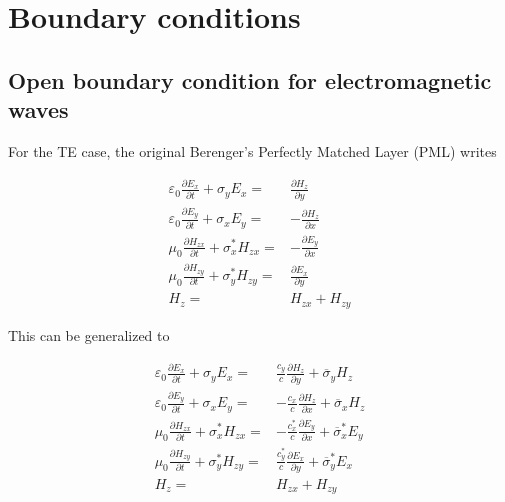 %
%



\section{Boundary conditions}

\subsection{Open boundary condition for electromagnetic waves}

For the TE case, the original Berenger's Perfectly Matched Layer (PML) writes

\begin{eqnarray}
\varepsilon _{0}\frac{\partial E_{x}}{\partial t}+\sigma _{y}E_{x} = & \frac{\partial H_{z}}{\partial y}\label{PML_def_1} \\
\varepsilon _{0}\frac{\partial E_{y}}{\partial t}+\sigma _{x}E_{y} = & -\frac{\partial H_{z}}{\partial x}\label{PML_def_2} \\
\mu _{0}\frac{\partial H_{zx}}{\partial t}+\sigma ^{*}_{x}H_{zx} = & -\frac{\partial E_{y}}{\partial x}\label{PML_def_3} \\
\mu _{0}\frac{\partial H_{zy}}{\partial t}+\sigma ^{*}_{y}H_{zy} = & \frac{\partial E_{x}}{\partial y}\label{PML_def_4} \\
H_{z}  = & H_{zx}+H_{zy}\label{PML_def_5}
\end{eqnarray}

This can be generalized to

\begin{eqnarray}
\varepsilon _{0}\frac{\partial E_{x}}{\partial t}+\sigma _{y}E_{x} = & \frac{c_{y}}{c}\frac{\partial H_{z}}{\partial y}+\overline{\sigma }_{y}H_{z}\label{APML_def_1} \\
\varepsilon _{0}\frac{\partial E_{y}}{\partial t}+\sigma _{x}E_{y} = & -\frac{c_{x}}{c}\frac{\partial H_{z}}{\partial x}+\overline{\sigma }_{x}H_{z}\label{APML_def_2} \\
\mu _{0}\frac{\partial H_{zx}}{\partial t}+\sigma ^{*}_{x}H_{zx} = & -\frac{c^{*}_{x}}{c}\frac{\partial E_{y}}{\partial x}+\overline{\sigma }_{x}^{*}E_{y}\label{APML_def_3} \\
\mu _{0}\frac{\partial H_{zy}}{\partial t}+\sigma ^{*}_{y}H_{zy} = & \frac{c^{*}_{y}}{c}\frac{\partial E_{x}}{\partial y}+\overline{\sigma }_{y}^{*}E_{x}\label{APML_def_4} \\
H_{z} = & H_{zx}+H_{zy}\label{APML_def_5}
\end{eqnarray}

